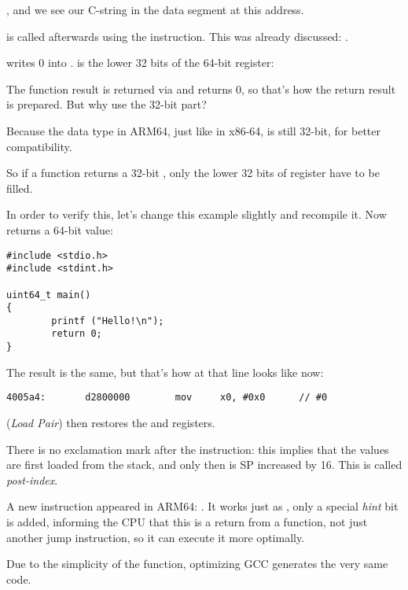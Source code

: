 , and we see our  C-string in the  data segment at this address.


\puts is called afterwards using the  instruction. This was already discussed: .

\MOV writes 0 into . 
 is the lower 32 bits of the 64-bit  register:



The function result is returned via  and \main returns 0, so that's how the return result is prepared.
But why use the 32-bit part?

Because the \Tint data type in ARM64, just like in x86-64, is still 32-bit, for better compatibility.

So if a function returns a 32-bit \Tint, only the lower 32 bits of  register have to be filled.

In order to verify this, let's change this example slightly and recompile it.
Now \main returns a 64-bit value:

\begin{lstlisting}[caption=\main returning a value of \TT{uint64\_t} type,style=customc]
#include <stdio.h>
#include <stdint.h>

uint64_t main()
{
        printf ("Hello!\n");
        return 0;
}
\end{lstlisting}

The result is the same, but that's how \MOV at that line looks like now:

\begin{lstlisting}[caption=\NonOptimizing GCC 4.8.1 + objdump]
  4005a4:       d2800000        mov     x0, #0x0      // #0
\end{lstlisting}


 (\emph{Load Pair}) then restores the  and  registers.

There is no exclamation mark after the instruction: this implies that the values are first loaded from the stack,
and only then is \ac{SP} increased by 16.
This is called \emph{post-index}.

A new instruction appeared in ARM64: \RET. 
It works just as , only a special \emph{hint} bit is added, informing the \ac{CPU}
that this is a return from a function, not just another jump instruction, so it can execute it more optimally.

Due to the simplicity of the function, optimizing GCC generates the very same code.
